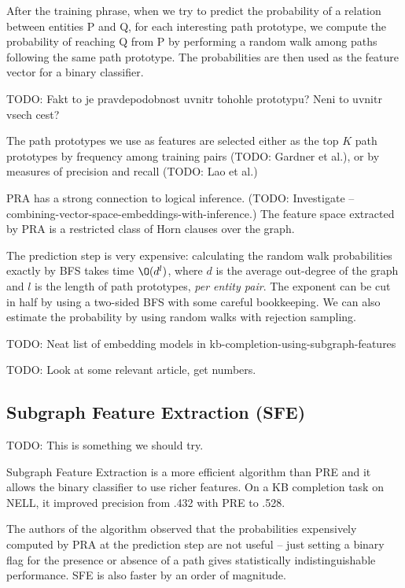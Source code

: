 After the training phrase, when we try to predict the probability of a relation
between entities P and Q, for each interesting path prototype, we compute the
probability of reaching Q from P by performing a random walk among paths
following the same path prototype.
The probabilities are then used as the feature vector for a binary classifier.

TODO: Fakt to je pravdepodobnost uvnitr tohohle prototypu? Neni to uvnitr vsech
cest?

The path prototypes we use as features are selected either as the top $K$ path
prototypes by frequency among training pairs (TODO: Gardner et al.), or by
measures of precision and recall (TODO: Lao et al.)

PRA has a strong connection to logical inference. (TODO: Investigate --
combining-vector-space-embeddings-with-inference.)
The feature space extracted by PRA is a restricted class of Horn clauses over
the graph.\cite{subgraph-feature-extraction}

The prediction step is very expensive: calculating the random walk
probabilities exactly by BFS takes time $\O(d^l)$, where $d$ is the
average out-degree of the graph and $l$ is the length of path prototypes,
\textit{per entity pair}.
The exponent can be cut in half by using a two-sided BFS with some careful
bookkeeping. We can also estimate the probability by using random walks with
rejection sampling.

TODO: Neat list of embedding models in kb-completion-using-subgraph-features

TODO: Look at some relevant article, get numbers.

\subsection{Subgraph Feature Extraction (SFE)}

TODO: This is something we should try.

Subgraph Feature Extraction\cite{subgraph-feature-extraction} is a more
efficient algorithm than PRE and it allows the binary classifier to use richer
features. On a KB completion task on NELL, it improved precision from .432 with
PRE to .528.


The authors of the algorithm observed that the probabilities expensively
computed by PRA at the prediction step are not
useful\cite{subgraph-feature-extraction} -- just setting a binary flag for the
presence or absence of a path gives statistically indistinguishable performance.
SFE is also faster by an order of magnitude.

